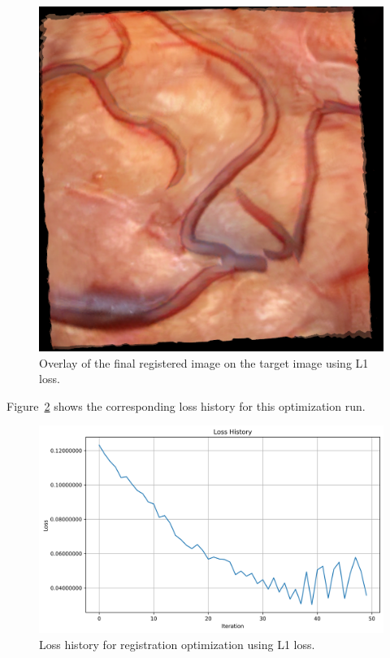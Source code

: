 \begin{figure}[htpb]
  \centering
  \includegraphics[scale=0.5]{figures/l1/alignment_overlay.png}
  \caption[Registration result with L1 loss]{Overlay of the final registered image on the target image using L1 loss.}
  \label{fig:l1_overlay}
\end{figure}

Figure~\ref{fig:l1_history} shows the corresponding loss history for this optimization run.

\begin{figure}[htpb]
  \centering
  \includegraphics[scale=0.65]{figures/l1/loss_history.png}
  \caption[Loss history for L1 optimization]{Loss history for registration optimization using L1 loss.}
  \label{fig:l1_history}
\end{figure}

